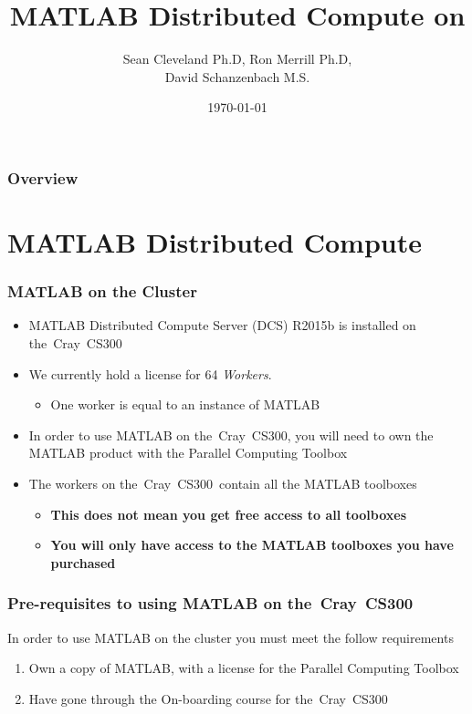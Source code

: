 \documentclass[t]{beamer}
\title[MATLAB on \CNAME]{MATLAB Distributed Compute on \CNAME } %
\author{Sean Cleveland Ph.D, Ron Merrill Ph.D,\\David Schanzenbach M.S.} %
\institute[University of Hawai\okina{}i -- ITS--CI] %
{
	Information Technology Services \\
	Department of Cyberinfrastructure \\
	University of Hawai\okina{}i \\ %
	\medskip
	\textbf{\url{https://www.hawaii.edu/its/ci/}}\\
	\textbf{\textit{uh-hpc-help@lists.hawaii.edu}} %
}
\date{\today} %
\newcommand{\CNAME}{the~Cray~CS300}
\newcommand{\TOTWRKS}{64}
\begin{document}
\begin{frame}
  \titlepage %
\end{frame}

\begin{frame}
  \frametitle{Overview} %
  \tableofcontents[] %
\end{frame}

\section{MATLAB Distributed Compute}

\begin{frame}
	\frametitle{MATLAB on the Cluster}
	\begin{itemize}
		\item MATLAB Distributed Compute Server (DCS) R2015b is installed on \CNAME
		\item We currently hold a license for \TOTWRKS{} \emph{Workers}.
			\begin{itemize}
				\item One worker is equal to an instance of MATLAB
			\end{itemize}
		\item In order to use MATLAB on \CNAME, you will need to own the MATLAB product with the Parallel Computing Toolbox
		\item The workers on \CNAME~contain all the MATLAB toolboxes
		\begin{itemize}
			\item \textbf{This does not mean you get free access to all toolboxes}
			\item \textbf{You will only have access to the MATLAB toolboxes you have purchased}
		\end{itemize}            
	\end{itemize}
\end{frame}


\begin{frame}
  \frametitle{Pre-requisites to using MATLAB on \CNAME{}}
  In order to use MATLAB on the cluster you must meet the follow requirements
  \begin{enumerate}
  \item Own a copy of MATLAB, with a license for the Parallel Computing Toolbox
  \item Have gone through the On-boarding course for \CNAME
  \end{enumerate}
\end{frame}
\end{document}
